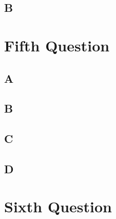 \documentclass{article}
\begin{document}
\begin{multicols*}{2}
\begin{flushleft}
{\centering\subsection*{B}}
{\centering \section*{Fifth Question}}
{\centering\subsection*{A}}
{\centering\subsection*{B}}
{\centering\subsection*{C}}
{\centering\subsection*{D}}
{\centering \section*{Sixth Question}}

\end{flushleft}
		\end{multicols*}
\end{document}
